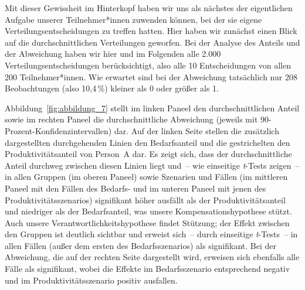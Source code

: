 \documentclass[justified,nobib,nohyper,symmetric,twoside]{tufte-book}
\begin{document}
Mit dieser Gewissheit im Hinterkopf haben wir uns als nächstes der eigentlichen Aufgabe unserer Teilnehmer*innen zuwenden können, bei der sie eigene Verteilungsentscheidungen zu treffen hatten.
Hier haben wir zunächst einen Blick auf die durchschnittlichen Verteilungen geworfen.
Bei der Analyse des Anteils und der Abweichung haben wir hier und im Folgenden alle 2.000 Verteilungsentscheidungen berücksichtigt, also alle 10 Entscheidungen von allen 200 Teilnehmer*innen.
Wie erwartet sind bei der Abweichung tatsächlich nur 208 Beobachtungen (also 10,4\,\%) kleiner als 0 oder größer als 1.

Abbildung~\ref{fig:abbildung_7} stellt im linken Paneel den durchschnittlichen Anteil sowie im rechten Paneel die durchschnittliche Abweichung (jeweils mit 90-Prozent-Konfidenzintervallen) dar.
Auf der linken Seite stellen die zusätzlich dargestellten durchgehenden Linien den Bedarfsanteil und die gestrichelten den Produktivitätsanteil von Person~A dar.
Es zeigt sich, dass der durchschnittliche Anteil durchweg zwischen diesen Linien liegt und~-- wie einseitige \textit{t}-Tests zeigen~-- in allen Gruppen (im oberen Paneel) sowie Szenarien und Fällen (im mittleren Paneel mit den Fällen des Bedarfs- und im unteren Paneel mit jenen des Produktivitätsszenarios) signifikant höher ausfällt als der Produktivitätsanteil und niedriger als der Bedarfsanteil, was unsere Kompensationshypothese stützt.
Auch unsere Verantwortlichkeitshypothese findet Stützung; der Effekt zwischen den Gruppen ist deutlich sichtbar und erweist sich~-- durch einseitige \textit{t}-Tests~-- in allen Fällen (außer dem ersten des Bedarfsszenarios) als signifikant.
Bei der Abweichung, die auf der rechten Seite dargestellt wird, erweisen sich ebenfalls alle Fälle als signifikant, wobei die Effekte im Bedarfsszenario entsprechend negativ und im Produktivitätsszenario positiv ausfallen.
\end{document}
